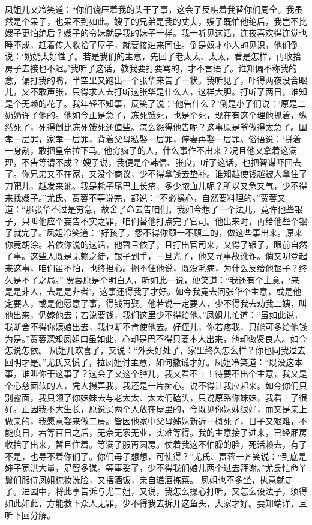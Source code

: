 \documentclass[12pt,oneside]{book}
\begin{document}
凤姐儿又冷笑道：“你们饶压着我的头干了事，这会子反哄着我替你们周全。我虽然是个呆子，也呆不到如此。嫂子的兄弟是我的丈夫，嫂子既怕他绝后，我岂不比嫂子更怕绝后？嫂子的令妹就是我的妹子一样。我一听见这话，连夜喜欢得连觉也睡不成，赶着传人收拾了屋子，就要接进来同住。倒是奴才小人的见识，他们倒说：‘奶奶太好性了。若是我们的主意，先回了老太太、太太，看是怎样，再收拾房子去接也不迟。’我听了这话，教我要打要骂的，才不言语了。谁知偏不称我的意，偏打我的嘴，半空里又跑出一个张华来告了一状。我听见了，吓得两夜没合眼儿，又不敢声张，只得求人去打听这张华是什么人，这样大胆。打听了两日，谁知是个无赖的花子。我年轻不知事，反笑了说：‘他告什么？’倒是小子们说：‘原是二奶奶许了他的。他如今正是急了，冻死饿死，也是个死，现在有这个理他抓着，纵然死了，死得倒比冻死饿死还值些。怎么怨得他告呢？这事原是爷做得太急了。国孝一层罪，家孝一层罪，背着父母私娶一层罪，停妻再娶一层罪。俗语说：‘拼着一身剐，敢把皇帝拉下马。’他穷疯了的人，什么事作不出来？况且他又拿着这满理，不告等请不成？’嫂子说，我便是个韩信、张良，听了这话，也把智谋吓回去了。你兄弟又不在家，又没个商议，少不得拿钱去垫补。谁知越使钱越被人拿住了刀靶儿，越发来讹。我是耗子尾巴上长疮，多少脓血儿呢？所以又急又气，少不得来找嫂子。”尤氏、贾蓉不等说完，都说：“不必操心，自然要料理的。”贾蓉又道：“那张华不过是穷急，故舍了命去告咱们。我如今想了一个法儿，竟许他些银子，只叫他应个妄告不实之罪，咱们替他打点完了官司。他出来时，再给他些个银子就完了。”凤姐冷笑道：“好孩子，怨不得你顾一不顾二的，做这些事出来。原来你竟胡涂。若依你说的这话，他暂且依了，且打出官司来，又得了银子，眼前自然了事。这些人既是无赖之徒，银子到手，一旦光了，他又寻事故讹诈。倘又叨登起来这事，咱们虽不怕，也终担心。搁不住他说，既没毛病，为什么反给他银子？终久是不了之局。”
贾蓉原是个明白人，听如此一说，便笑道：“我还有个主意，‘来是是非人，去是是非者’，这事还得我了才好。如今我竟去问张华个主意，或是他定要人，或是他愿意了事，得钱再娶。他若说一定要人，少不得我去劝我二姨，叫他出来，仍嫁他去；若说要钱，我们这里少不得给他。”凤姐儿忙道：“虽如此说，我断舍不得你姨娘出去，我也断不肯使他去。好侄儿，你若疼我，只能可多给他钱为是。”贾蓉深知凤姐口虽如此，心却是巴不得只要本人出来，他却做贤良人。如今怎说怎依。
凤姐儿欢喜了，又说：“外头好处了，家里终久怎么样？你也同我过去回明才是。”尤氏又慌了，拉凤姐讨主意，如何撒谎才好。凤姐冷笑道：“既没这本事，谁叫你干这事了？这会子又这个腔儿，我又看不上！待要不出个主意，我又是个心慈面软的人，凭人撮弄我，我还是一片痴心。说不得让我应起来。如今你们只别露面，我只领了你妹妹去与老太太、太太们磕头，只说原系你妹妹，我看上了很好。正因我不大生长，原说买两个人放在屋里的，今既见你妹妹很好，而又是亲上做亲的，我愿意娶来做二房。皆因他家中父母姊妹新近一概死了，日子又艰难，不能度日，若等百日之后，无奈无家无业，实难等得。我的主意接了进来，已经厢房收拾了出来，暂且住着。等满了服再圆房。仗着我这不怕臊的脸，死活赖去，有了不是，也寻不着你们了。你们母子想想，可使得？”尤氏、贾蓉一齐笑说：“到底是婶子宽洪大量，足智多谋。等事妥了，少不得我们娘儿两个过去拜谢。”尤氏忙命丫鬟们服侍凤姐梳妆洗脸，又摆酒饭，亲自递酒拣菜。
凤姐也不多坐，执意就走了。进园中，将此事告诉与尤二姐，又说，我怎么操心打听，又怎么设法子，须得如此如此，方能救下众人无罪，少不得我去拆开这鱼头，大家才好。要知端详，且听下回分解。
 
\end{document}
